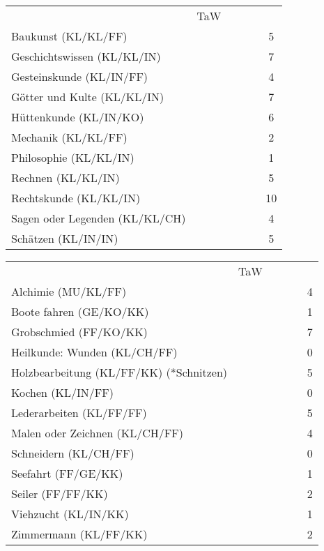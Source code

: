 \documentclass{article}
\begin{document}
  \begin{table}[ht]
    \centering
    \begin{tabularx}{0.8\linewidth}{|Xclcc|c|}
      \hline
      \rowcolor{gray} \multicolumn{5}{|l|}{Wissen (B)} & TaW\\
      \rowcolor{white} Baukunst (KL/KL/FF) &&&&&5\\
      \rowcolor{white} Geschichtswissen (KL/KL/IN) &&&&&7\\
      \rowcolor{white} Gesteinskunde (KL/IN/FF) &&&&&4\\
      \rowcolor{white} Götter und Kulte (KL/KL/IN) &&&&&7\\
      \rowcolor{white} Hüttenkunde (KL/IN/KO) &&&&&6\\
      \rowcolor{white} Mechanik (KL/KL/FF) &&&&&2\\
      \rowcolor{white} Philosophie (KL/KL/IN) &&&&&1\\
      \rowcolor{white} Rechnen (KL/KL/IN) &&&&&5\\
      \rowcolor{white} Rechtskunde (KL/KL/IN) &&&&&10\\
      \rowcolor{white} Sagen oder Legenden (KL/KL/CH) &&&&&4\\
      \rowcolor{white} Schätzen (KL/IN/IN) &&&&&5\\
      \hline
    \end{tabularx}
    \centering
    \begin{tabularx}{0.8\linewidth}{|Xclcc|c|}
      \hline
      \rowcolor{gray} \multicolumn{5}{|l|}{Handwerk (B)} & TaW\\
      \rowcolor{white} Alchimie (MU/KL/FF) &&&&&4\\
      \rowcolor{white} Boote fahren (GE/KO/KK) &&&&&1\\
      \rowcolor{white} Grobschmied (FF/KO/KK) &&&&&7\\
      \rowcolor{white} Heilkunde: Wunden (KL/CH/FF) &&&&&0\\
      \rowcolor{white} Holzbearbeitung  (KL/FF/KK) (*Schnitzen) &&&&&5\\
      \rowcolor{white} Kochen (KL/IN/FF) &&&&&0\\
      \rowcolor{white} Lederarbeiten (KL/FF/FF) &&&&&5\\
      \rowcolor{white} Malen oder Zeichnen (KL/CH/FF) &&&&&4\\
      \rowcolor{white} Schneidern (KL/CH/FF) &&&&&0\\
      \rowcolor{white} Seefahrt (FF/GE/KK) &&&&&1\\
      \rowcolor{white} Seiler (FF/FF/KK) &&&&&2\\
      \rowcolor{white} Viehzucht (KL/IN/KK) &&&&&1\\
      \rowcolor{white} Zimmermann (KL/FF/KK) &&&&&2\\
      \hline
    \end{tabularx}
  \end{table}
\end{document}
